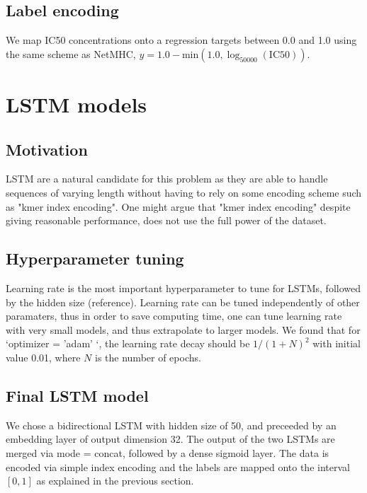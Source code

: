 \documentclass{article} %
\begin{document}
\subsection{Label encoding}

We map IC50 concentrations onto a regression targets between 0.0 and 1.0 using the same scheme as NetMHC, $y = 1.0 - \textrm{min}(1.0, \log_{50000}(\textrm{IC50}))$.


\section{LSTM models}
\subsection{Motivation}

LSTM are a natural candidate for this problem as they are able to handle sequences of varying length without having to rely on some encoding scheme such as "kmer index encoding". One might argue that  "kmer index encoding" despite giving reasonable performance, does not use the full power of the dataset. 
\subsection{Hyperparameter tuning}

Learning rate is the most important hyperparameter to tune for LSTMs, followed by the hidden size (reference). Learning rate can be tuned independently of other paramaters, thus in order to save computing time, one can tune learning rate with very small models, and thus extrapolate to larger models. We found that for `optimizer = 'adam' `, the learning rate decay should be $1/(1+N)^2$ with initial value 0.01, where $N$ is the number of epochs.


\subsection{Final LSTM model}
We chose a bidirectional LSTM with hidden size of 50, and preceeded by an embedding layer of output dimension 32. The output of the two LSTMs are merged via mode = concat, followed by a dense sigmoid layer. The data is encoded via simple index encoding and the labels are mapped onto the interval $\left[0,1\right]$ as explained in the previous section.
\end{document}
